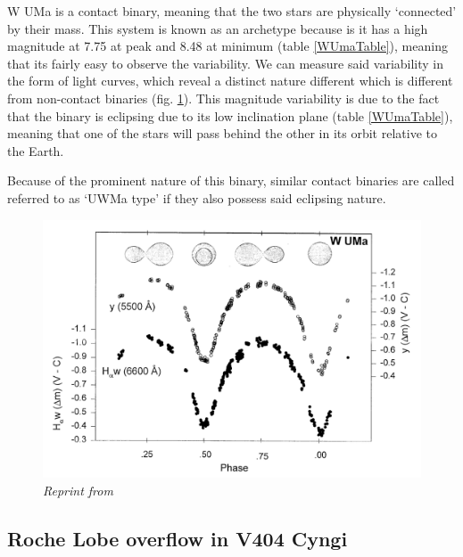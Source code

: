 \documentclass[12pt, letterpaper]{article}
\begin{document}
        
        W UMa is a contact binary, meaning that the two stars are physically `connected' by their mass. This system is known as an archetype because is it has a high magnitude at 7.75 at peak and 8.48 at minimum (table \ref{WUmaTable}), meaning that its fairly easy to observe the variability. We can measure said variability in the form of light curves, which reveal a distinct nature different which is different from non-contact binaries (fig. \ref{WUMaLightcruve}). This magnitude variability is due to the fact that the binary is eclipsing due to its low inclination plane (table \ref{WUmaTable}), meaning that one of the stars will pass behind the other in its orbit relative to the Earth. 

        Because of the prominent nature of this binary, similar contact binaries are called referred to as `UWMa type' if they also possess said eclipsing nature. 

        \begin{figure}[h!]
            \centering
            \includegraphics[scale= .3]{figs/W Uma Lightcurve.png}
            \caption{\textit{Reprint from~\cite{Morgan_1997}}}
            \label{WUMaLightcruve}
        \end{figure}
        \pagebreak


    \subsection{\centering Roche Lobe overflow in V404 Cyngi}
\end{document}
